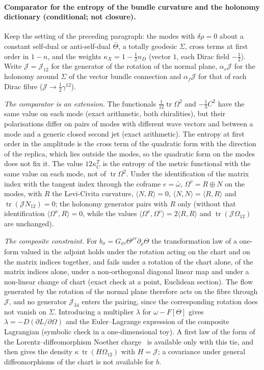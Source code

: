 \paragraph{Comparator for the entropy of the bundle curvature and the holonomy dictionary (conditional; not closure).}
Keep the setting of the preceding paragraph: the modes with \(\delta\rho=0\) about a constant self-dual or anti-self-dual \(\bar\Theta\), a totally geodesic \(\Sigma\), cross terms at first order in \(1-n\), and the weights \(\kappa_X=1-\tfrac12n_D\) (vector \(1\), each Dirac field \(-\tfrac12\)). Write \(\mathcal J=\mathcal J_{12}\) for the generator of the rotation of the normal plane, \(\alpha_v\mathcal J\) for the holonomy around \(\Sigma\) of the vector bundle connection and \(\alpha_f\mathcal J\) for that of each Dirac fibre (\(\mathcal J\to\tfrac12\gamma^{12}\)).

\emph{The comparator is an extension.} The functionals \(\tfrac1{12}\operatorname{tr}\Omega^2\) and \(-\tfrac13C^2\) have the same value on each mode (exact arithmetic, both chiralities), but their polarisations differ on pairs of modes with different wave vectors and between a mode and a generic closed second jet (exact arithmetic). The entropy at first order in the amplitude is the cross term of the quadratic form with the direction of the replica, which lies outside the modes, so the quadratic form on the modes does not fix it. The value \(12\kappa_C^T\) is the entropy of the metric functional with the same value on each mode, not of \(\operatorname{tr}\Omega^2\). Under the identification of the matrix index with the tangent index through the coframe \(e=\bar\omega\), \(\Omega^v=R\oplus N\) on the modes, with \(R\) the Levi-Civita curvature, \(\langle N,R\rangle=0\), \(\langle N,N\rangle=\langle R,R\rangle\) and \(\operatorname{tr}(\mathcal J N_{12})=0\); the holonomy generator pairs with \(R\) only (without that identification \(\langle\Omega^v,R\rangle=0\), while the values \(\langle\Omega^v,\Omega^v\rangle=2\langle R,R\rangle\) and \(\operatorname{tr}(\mathcal J\Omega_{12})\) are unchanged).

\emph{The composite constraint.} For \(b_\sigma=G_{\sigma\tau}\Theta^{\rho\tau}\partial_\rho\Theta\) the transformation law of a one-form valued in the adjoint holds under the rotation acting on the chart and on the matrix indices together, and fails under a rotation of the chart alone, of the matrix indices alone, under a non-orthogonal diagonal linear map and under a non-linear change of chart (exact check at a point, Euclidean section). The flow generated by the rotation of the normal plane therefore acts on the fibre through \(\mathcal J\), and no generator \(\mathcal J_{34}\) enters the pairing, since the corresponding rotation does not vanish on \(\Sigma\). Introducing a multiplier \(\lambda\) for \(\omega-F[\Theta]\) gives \(\lambda=-D(\partial L/\partial\Omega)\) and the Euler--Lagrange expression of the composite Lagrangian (symbolic check in a one-dimensional toy). A first law of the form of the Lorentz--diffeomorphism Noether charge~\cite{JacobsonMohd2015} is available only with this tie, and then gives the density \(\kappa\,\operatorname{tr}(H\Omega_{12})\) with \(H=\mathcal J\); a covariance under general diffeomorphisms of the chart is not available for \(b\).

